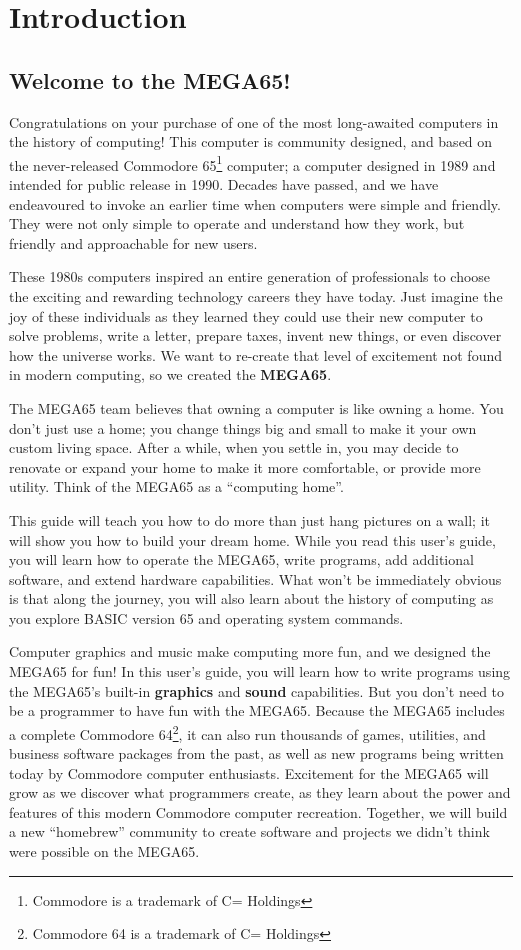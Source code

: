 \chapter{Introduction}


\section{Welcome to the MEGA65!}

Congratulations on your purchase of one of the most long-awaited computers in the history of computing! This computer is community designed, and based on the never-released Commodore{\textregistered} 65\footnote{Commodore is a trademark of C= Holdings} computer; a computer designed in 1989 and intended for public release in 1990. Decades have passed, and we have endeavoured to invoke an earlier time when computers were simple and friendly. They were not only simple to operate and understand how they work, but friendly and approachable for new users.

These 1980s computers inspired an entire generation of professionals to choose the exciting and rewarding technology careers they have today. Just imagine the joy of these individuals as they learned they could use their new computer to solve problems, write a letter, prepare taxes, invent new things, or even discover how the universe works. We want to re-create that level of excitement not found in modern computing, so we created the {\bf MEGA65}.

The MEGA65 team believes that owning a computer is like owning a home. You don't just use a home; you change things big and small to make it your own custom living space. After a while, when you settle in, you may decide to renovate or expand your home to make it more comfortable, or provide more utility. Think of the MEGA65 as a ``computing home''.

This guide will teach you how to do more than just hang pictures on a wall; it will show you how to build your dream home. While you read this user's guide, you will learn how to operate the MEGA65, write programs, add additional software, and extend hardware capabilities. What won't be immediately obvious is that along the journey, you will also learn about the history of computing as you explore BASIC version 65 and operating system commands.

Computer graphics and music make computing more fun, and we designed the MEGA65 for fun! In this user's guide, you will learn how to write programs using the MEGA65's built-in {\bf graphics} and {\bf sound} capabilities. But you don't need to be a programmer to have fun with the MEGA65. Because the MEGA65 includes a complete Commodore{\textregistered} 64{\texttrademark}\footnote{Commodore 64 is a trademark of C= Holdings}, it can also run thousands of games, utilities, and business software packages from the past, as well as new programs being written today by Commodore computer enthusiasts. Excitement for the MEGA65 will grow as we discover what programmers create, as they learn about the power and features of this modern Commodore computer recreation. Together, we will build a new ``homebrew'' community to create software and projects we didn't think were possible on the MEGA65.


